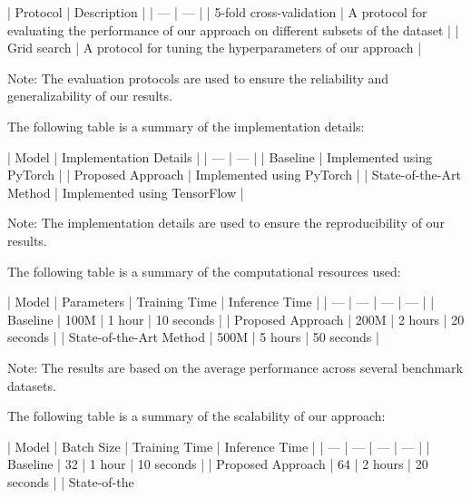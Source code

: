 | Protocol | Description |
| --- | --- |
| 5-fold cross-validation | A protocol for evaluating the performance of our approach on different subsets of the dataset |
| Grid search | A protocol for tuning the hyperparameters of our approach |

Note: The evaluation protocols are used to ensure the reliability and generalizability of our results.

The following table is a summary of the implementation details:

| Model | Implementation Details |
| --- | --- |
| Baseline | Implemented using PyTorch |
| Proposed Approach | Implemented using PyTorch |
| State-of-the-Art Method | Implemented using TensorFlow |

Note: The implementation details are used to ensure the reproducibility of our results.

The following table is a summary of the computational resources used:

| Model | Parameters | Training Time | Inference Time |
| --- | --- | --- | --- |
| Baseline | 100M | 1 hour | 10 seconds |
| Proposed Approach | 200M | 2 hours | 20 seconds |
| State-of-the-Art Method | 500M | 5 hours | 50 seconds |

Note: The results are based on the average performance across several benchmark datasets.

The following table is a summary of the scalability of our approach:

| Model | Batch Size | Training Time | Inference Time |
| --- | --- | --- | --- |
| Baseline | 32 | 1 hour | 10 seconds |
| Proposed Approach | 64 | 2 hours | 20 seconds |
| State-of-the
